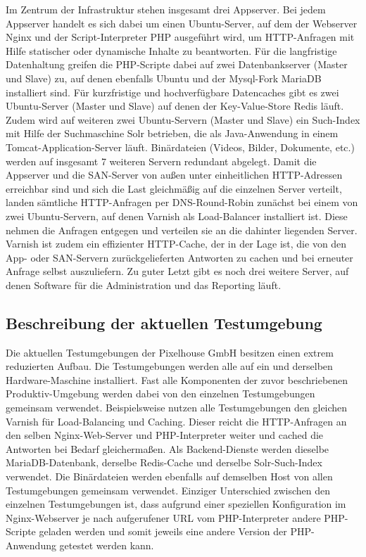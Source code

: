 Im Zentrum der Infrastruktur stehen insgesamt drei Appserver. Bei jedem Appserver handelt es sich dabei um einen Ubuntu-Server, auf dem der Webserver Nginx und der Script-Interpreter PHP ausgeführt wird, um HTTP-Anfragen mit Hilfe statischer oder dynamische Inhalte zu beantworten. Für die langfristige Datenhaltung greifen die PHP-Scripte dabei auf zwei Datenbankserver (Master und Slave) zu, auf denen ebenfalls Ubuntu und der Mysql-Fork MariaDB installiert sind. Für kurzfristige und hochverfügbare Datencaches gibt es zwei Ubuntu-Server (Master und Slave) auf denen der Key-Value-Store Redis läuft. Zudem wird auf weiteren zwei Ubuntu-Servern (Master und Slave) ein Such-Index mit Hilfe der Suchmaschine Solr betrieben, die als Java-Anwendung in einem Tomcat-Application-Server läuft. Binärdateien (Videos, Bilder, Dokumente, etc.) werden auf insgesamt 7 weiteren Servern redundant abgelegt. Damit die Appserver und die SAN-Server von außen unter einheitlichen HTTP-Adressen erreichbar sind und sich die Last gleichmäßig auf die einzelnen Server verteilt, landen sämtliche HTTP-Anfragen per DNS-Round-Robin zunächst bei einem von zwei Ubuntu-Servern, auf denen Varnish als Load-Balancer installiert ist. Diese nehmen die Anfragen entgegen und verteilen sie an die dahinter liegenden Server. Varnish ist zudem ein effizienter HTTP-Cache, der in der Lage ist, die von den App- oder SAN-Servern zurückgelieferten Antworten zu cachen und bei erneuter Anfrage selbst auszuliefern. Zu guter Letzt gibt es noch drei weitere Server, auf denen Software für die Administration und das Reporting läuft.

\subsection{Beschreibung der aktuellen Testumgebung}

Die aktuellen Testumgebungen der Pixelhouse GmbH besitzen einen extrem reduzierten Aufbau. Die Testumgebungen werden alle auf ein und derselben Hardware-Maschine installiert. Fast alle Komponenten der zuvor beschriebenen Produktiv-Umgebung werden dabei von den einzelnen Testumgebungen gemeinsam verwendet. Beispielsweise nutzen alle Testumgebungen den gleichen Varnish für Load-Balancing und Caching. Dieser reicht die HTTP-Anfragen an den selben Nginx-Web-Server und PHP-Interpreter weiter und cached die Antworten bei Bedarf gleichermaßen. Als Backend-Dienste werden dieselbe MariaDB-Datenbank, derselbe Redis-Cache und derselbe Solr-Such-Index verwendet. Die Binärdateien werden ebenfalls auf demselben Host von allen Testumgebungen gemeinsam verwendet. Einziger Unterschied zwischen den einzelnen Testumgebungen ist, dass aufgrund einer speziellen Konfiguration im Nginx-Webserver je nach aufgerufener URL vom PHP-Interpreter andere PHP-Scripte geladen werden und somit jeweils eine andere Version der PHP-Anwendung getestet werden kann.


